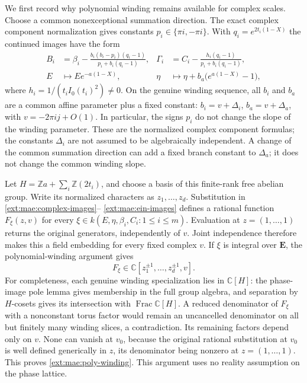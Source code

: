 \documentclass[11pt,a4paper]{article}
\theoremstyle{definition}\newtheorem{definition}[theorem]{Definition}
\theoremstyle{remark}\newtheorem{remark}[theorem]{Remark}
\begin{document}
We first record why polynomial winding remains available for complex
scales.  Choose a common nonexceptional summation direction.  The exact
complex component normalization gives constants $p_i\in\{\pi i,-\pi i\}$.
With $q_i=e^{2t_i(1-X)}$ the continued images have the form
\begin{align}
 B_i&=\beta_i-
       \frac{b_i(b_i-p_i)(q_i-1)}{p_i+b_i(q_i-1)},
 &\Gamma_i&=C_i-
       \frac{h_i(q_i-1)}{p_i+b_i(q_i-1)},
 \label{ext:mae:complex-images}\\
 E&\longmapsto E e^{-a(1-X)},
 &\eta&\longmapsto\eta+b_a\bigl(e^{a(1-X)}-1\bigr),
 \label{ext:mae:ein-images}
\end{align}
where $h_i=1/(t_iI_0(t_i)^2)\ne0$.  On the genuine winding sequence,
all $b_i$ and $b_a$ are a common affine parameter plus a fixed constant:
$b_i=v+\Delta_i$, $b_a=v+\Delta_a$, with $v=-2\pi i j+O(1)$.
In particular, the signs $p_i$ do not change the slope of the winding
parameter.  These are the normalized complex component formulas; the
constants $\Delta_i$ are not assumed to be algebraically independent.
A change of the common summation direction can add a fixed branch
constant to $\Delta_a$; it does not change the common winding slope.

Let $H=\mathbb Za+\sum_i\mathbb Z(2t_i)$, and choose a basis of this
finite-rank free abelian group.  Write its normalized characters as
$z_1,\ldots,z_d$.  Substitution in \eqref{ext:mae:complex-images}--
\eqref{ext:mae:ein-images} defines a rational function $F_\xi(z,v)$ for every
$\xi\in k(E,\eta,\beta_i,C_i:1\le i\le m)$.  Evaluation at $z=(1,\ldots,1)$
returns the original generators, independently of $v$.  Joint independence
therefore makes this a field embedding for every fixed complex $v$.
If $\xi$ is integral over $\mathbf E$, the polynomial-winding argument
gives
\begin{equation}
             F_\xi\in\mathbb C[z_1^{\pm1},\ldots,z_d^{\pm1},v].
 \label{ext:mae:poly-winding}
\end{equation}
For completeness, each genuine winding specialization lies in
$\mathbb C[H]$: the phase-image pole lemma gives membership in the full
group algebra, and separation by $H$-cosets gives its intersection with
$\operatorname{Frac}\mathbb C[H]$.  A reduced denominator of $F_\xi$ with
a nonconstant torus factor would remain an uncancelled denominator on
all but finitely many winding slices, a contradiction.  Its remaining
factors depend only on $v$.  None can vanish at $v_0$, because the
original rational substitution at $v_0$ is well defined generically in
$z$, its denominator being nonzero at $z=(1,\ldots,1)$.  This proves
\eqref{ext:mae:poly-winding}.  This argument uses no reality assumption on
the phase lattice.
\end{document}
